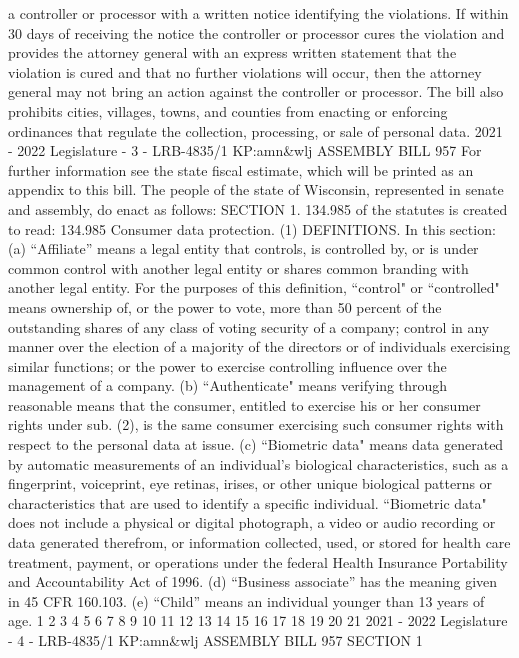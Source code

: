 a controller or processor with a written notice identifying the violations. If within
30 days of receiving the notice the controller or processor cures the violation and
provides the attorney general with an express written statement that the violation
is cured and that no further violations will occur, then the attorney general may not
bring an action against the controller or processor. The bill also prohibits cities,
villages, towns, and counties from enacting or enforcing ordinances that regulate the
collection, processing, or sale of personal data.
2021 - 2022 Legislature - 3 - LRB-4835/1
KP:amn&wlj
 ASSEMBLY BILL 957
For further information see the state fiscal estimate, which will be printed as
an appendix to this bill.
The people of the state of Wisconsin, represented in senate and assembly, do
enact as follows:
SECTION 1. 134.985 of the statutes is created to read:
134.985 Consumer data protection. (1) DEFINITIONS. In this section:
(a) “Affiliate” means a legal entity that controls, is controlled by, or is under
common control with another legal entity or shares common branding with another
legal entity. For the purposes of this definition, “control" or “controlled" means
ownership of, or the power to vote, more than 50 percent of the outstanding shares
of any class of voting security of a company; control in any manner over the election
of a majority of the directors or of individuals exercising similar functions; or the
power to exercise controlling influence over the management of a company.
(b) “Authenticate" means verifying through reasonable means that the
consumer, entitled to exercise his or her consumer rights under sub. (2), is the same
consumer exercising such consumer rights with respect to the personal data at issue.
(c) “Biometric data" means data generated by automatic measurements of an
individual's biological characteristics, such as a fingerprint, voiceprint, eye retinas,
irises, or other unique biological patterns or characteristics that are used to identify
a specific individual. “Biometric data" does not include a physical or digital
photograph, a video or audio recording or data generated therefrom, or information
collected, used, or stored for health care treatment, payment, or operations under the
federal Health Insurance Portability and Accountability Act of 1996.
(d) “Business associate” has the meaning given in 45 CFR 160.103.
(e) “Child” means an individual younger than 13 years of age.
1
2
3
4
5
6
7
8
9
10
11
12
13
14
15
16
17
18
19
20
21
2021 - 2022 Legislature - 4 - LRB-4835/1
KP:amn&wlj
 ASSEMBLY BILL 957 SECTION 1
